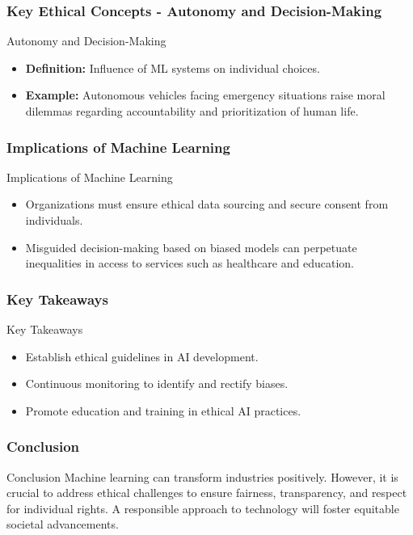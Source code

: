 \documentclass[aspectratio=169]{beamer}
\begin{document}
\begin{frame}[fragile]
    \frametitle{Key Ethical Concepts - Autonomy and Decision-Making}
    \begin{block}{Autonomy and Decision-Making}
        \begin{itemize}
            \item \textbf{Definition:} Influence of ML systems on individual choices.
            \item \textbf{Example:} Autonomous vehicles facing emergency situations raise 
            moral dilemmas regarding accountability and prioritization of human life.
        \end{itemize}
    \end{block}
\end{frame}

\begin{frame}[fragile]
    \frametitle{Implications of Machine Learning}
    \begin{block}{Implications of Machine Learning}
        \begin{itemize}
            \item Organizations must ensure ethical data sourcing and secure consent 
            from individuals.
            \item Misguided decision-making based on biased models can perpetuate inequalities 
            in access to services such as healthcare and education.
        \end{itemize}
    \end{block}
\end{frame}

\begin{frame}[fragile]
    \frametitle{Key Takeaways}
    \begin{block}{Key Takeaways}
        \begin{itemize}
            \item Establish ethical guidelines in AI development.
            \item Continuous monitoring to identify and rectify biases.
            \item Promote education and training in ethical AI practices.
        \end{itemize}
    \end{block}
\end{frame}

\begin{frame}[fragile]
    \frametitle{Conclusion}
    \begin{block}{Conclusion}
        Machine learning can transform industries positively. However, it is crucial 
        to address ethical challenges to ensure fairness, transparency, and respect 
        for individual rights. A responsible approach to technology will foster 
        equitable societal advancements.
    \end{block}
\end{frame}
\end{document}
